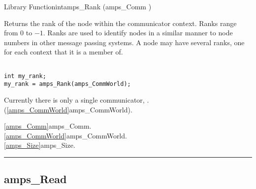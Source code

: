 \begin{deftypefn}{Library Function}{int}{amps\_Rank}
                 (amps_Comm )

\DESCRIPTION

Returns the rank of the node within the 
communicator context.  Ranks range from 0 to
 $-1$.  Ranks are used to identify nodes
in a similar manner to node numbers in other message passing systems.  A
node may have several ranks, one for each context that it is a member
of.

\EXAMPLE

\begin{display}\begin{verbatim}

int my_rank;
my_rank = amps_Rank(amps_CommWorld);

\end{verbatim}\end{display}


\NOTES

Currently there is only a single communicator, .
(\vref{amps_CommWorld}{amps\_CommWorld}).

\SEEALSO
\vref{amps_Comm}{amps\_Comm}. \\
\vref{amps_CommWorld}{amps\_CommWorld}. \\
\vref{amps_Size}{amps\_Size}. \\

\end{deftypefn}


\noindent\rule{\textwidth}{1mm}

\subsection{amps\_Read}
\label{amps_ReadType}



